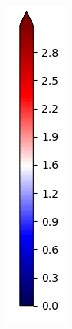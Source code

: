 \documentclass[journal=jpcbfk,manusciprt=article]{achemso}
\begin{document}
\begin{figure}
\begin{subfigure}{0.0544\linewidth}
        \includegraphics[width=\linewidth]{colorbar_seismic.png}

\end{subfigure}
\end{figure}
\end{document}
